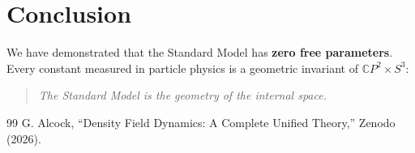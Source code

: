 \documentclass[aps,prl,twocolumn,superscriptaddress]{revtex4-2}
\begin{document}
\section{Conclusion}

We have demonstrated that the Standard Model has \textbf{zero free parameters}.
Every constant measured in particle physics is a geometric invariant of
$\mathbb{C}P^2 \times S^3$:
\begin{quote}
\emph{The Standard Model is the geometry of the internal space.}
\end{quote}

\begin{acknowledgments}
[Acknowledgments]
\end{acknowledgments}

\begin{thebibliography}{99}
 G. Alcock, ``Density Field Dynamics: A Complete Unified Theory,'' Zenodo (2026).
\end{thebibliography}
\end{document}
